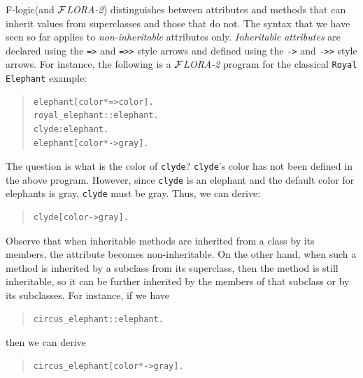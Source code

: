 \documentclass[11pt]{article}
\newcommand{\FLORA}{{\mbox{${\cal F}${\small\it LORA}\rm\emph{-2}}}\xspace}
\newcommand{\fl}{\mbox{F-logic}\xspace}
\begin{document}
\fl (and \FLORA) distinguishes between attributes and methods that can
inherit values from superclasses and those that do not. The syntax that we
have seen so far applies to \emph{non-inheritable} attributes only.
\emph{Inheritable attributes} are declared using the {\tt *=>} and {\tt *=>>}
style arrows and defined using the {\tt *->} and {\tt *->>} style arrows. For
instance, the following is a \FLORA program for the classical {\tt Royal
Elephant} example:
\begin{quote}
\begin{verbatim}
elephant[color*=>color].
royal_elephant::elephant.
clyde:elephant.
elephant[color*->gray].
\end{verbatim}
\end{quote}
The question is what is the color of {\tt clyde}?
{\tt clyde}'s color has not been defined in the above program. However, since
{\tt clyde} is an elephant and the default color for elephants is gray,
{\tt clyde}
must be gray. Thus, we can derive:
\begin{quote}
\begin{verbatim}
clyde[color->gray].  
\end{verbatim}
\end{quote}
Observe that when inheritable methods are inherited from a class by its
members, the attribute becomes non-inheritable. On the other hand, when
such a method is inherited by a subclass from its superclass, then the
method is still inheritable, so it can be further inherited by the members
of that subclass or by its subclasses. For instance, if we have
\begin{quote}
\begin{verbatim}
circus_elephant::elephant.
\end{verbatim}
\end{quote}
then we can derive 
\begin{quote}
\begin{verbatim}
circus_elephant[color*->gray].  
\end{verbatim}
\end{quote}
\end{document}
